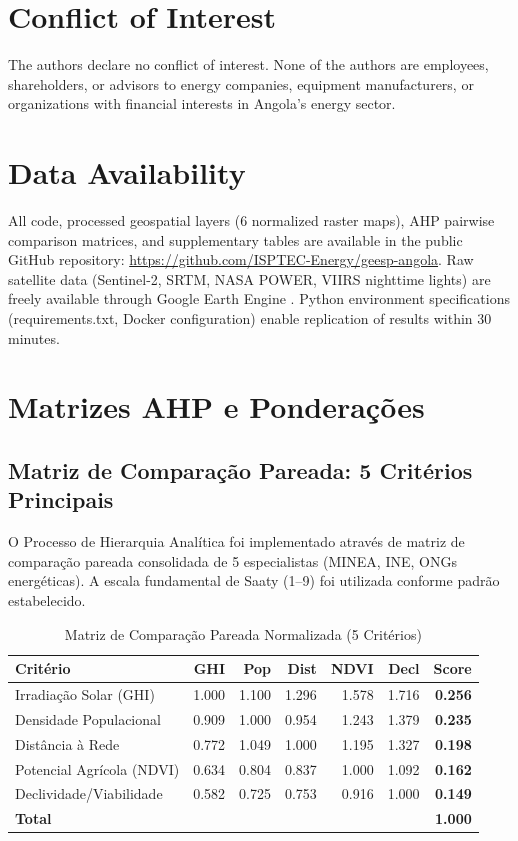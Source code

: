 \documentclass[12pt, a4paper]{article}
\begin{document}
\section*{Conflict of Interest}
The authors declare no conflict of interest. None of the authors are employees, shareholders, or advisors to energy companies, equipment manufacturers, or organizations with financial interests in Angola's energy sector.

\section*{Data Availability}
All code, processed geospatial layers (6 normalized raster maps), AHP pairwise comparison matrices, and supplementary tables are available in the public GitHub repository: \url{https://github.com/ISPTEC-Energy/geesp-angola}. Raw satellite data (Sentinel-2, SRTM, NASA POWER, VIIRS nighttime lights) are freely available through Google Earth Engine \citep{nasa_power}. Python environment specifications (requirements.txt, Docker configuration) enable replication of results within 30 minutes.

\appendix

\section{Matrizes AHP e Ponderações}
\label{app:ahp_matrix}

\subsection{Matriz de Comparação Pareada: 5 Critérios Principais}

O Processo de Hierarquia Analítica foi implementado através de matriz de comparação pareada consolidada de 5 especialistas (MINEA, INE, ONGs energéticas). A escala fundamental de Saaty (1–9) foi utilizada conforme padrão estabelecido.

\begin{table}[H]
\centering
\caption{Matriz de Comparação Pareada Normalizada (5 Critérios)}
\label{tab:ahp_matrix_detailed}
\footnotesize
\begin{tabular}{|l|r|r|r|r|r|r|}
\hline
\textbf{Critério} & \textbf{GHI} & \textbf{Pop} & \textbf{Dist} & \textbf{NDVI} & \textbf{Decl} & \textbf{Score} \\
\hline
Irradiação Solar (GHI) & 1.000 & 1.100 & 1.296 & 1.578 & 1.716 & \textbf{0.256} \\
Densidade Populacional & 0.909 & 1.000 & 0.954 & 1.243 & 1.379 & \textbf{0.235} \\
Distância à Rede & 0.772 & 1.049 & 1.000 & 1.195 & 1.327 & \textbf{0.198} \\
Potencial Agrícola (NDVI) & 0.634 & 0.804 & 0.837 & 1.000 & 1.092 & \textbf{0.162} \\
Declividade/Viabilidade & 0.582 & 0.725 & 0.753 & 0.916 & 1.000 & \textbf{0.149} \\
\hline
\textbf{Total} & & & & & & \textbf{1.000} \\
\hline
\end{tabular}
\end{table}
\end{document}
